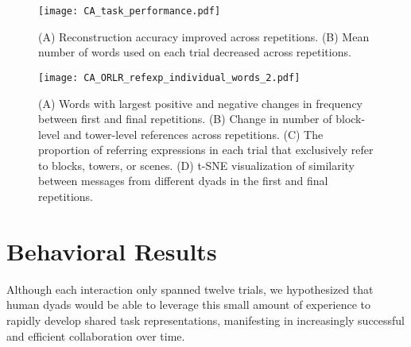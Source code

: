 \documentclass[10pt,letterpaper]{article}
\begin{document}
\begin{figure}[tbp]
\vspace{-1.5em}
\begin{center}
\texttt{[image: CA\_task\_performance.pdf]}
\vspace{-1.5em}
\caption{(A) Reconstruction accuracy improved across repetitions. (B) Mean number of words used on each trial decreased across repetitions.}
\label{fig:performance}
\vspace{-1em}
\end{center}
\end{figure}

\begin{figure*}[tp]%
\begin{center}
\texttt{[image: CA\_ORLR\_refexp\_individual\_words\_2.pdf]}
\vspace{-2em}
\caption{(A) Words with largest positive and negative changes in frequency between first and final repetitions. (B) Change in number of block-level and tower-level references across repetitions. (C) The proportion of referring expressions in each trial that exclusively refer to blocks, towers, or scenes. (D) t-SNE visualization of similarity between messages from different dyads in the first and final repetitions.}
\label{fig:refexp}
\end{center}
\end{figure*}



\section{Behavioral Results}
Although each interaction only spanned twelve trials, we hypothesized that human dyads would be able to leverage this small amount of experience to rapidly develop shared task representations, manifesting in increasingly successful and efficient collaboration over time. 
\end{document}
